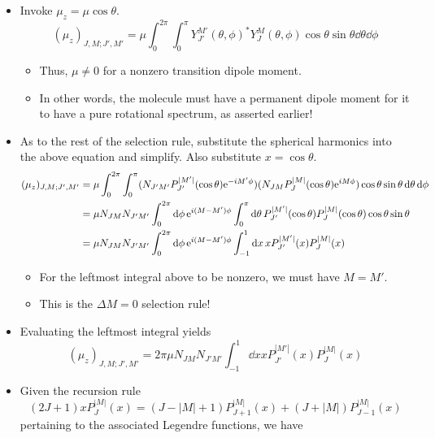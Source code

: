 \documentclass[../notes.tex]{subfiles}
\begin{document}
\begin{itemize}
\begin{equation*}
    \end{equation*}
    \item Invoke $\mu_z=\mu\cos\theta$.
    \begin{equation*}
        (\mu_z)_{J,M;J',M'} = \mu\int_0^{2\pi}\int_0^\pi Y_{J'}^{M'}(\theta,\phi)^*Y_J^M(\theta,\phi)\cos\theta\sin\theta\dd{\theta}\dd{\phi}
    \end{equation*}
    \begin{itemize}
        \item Thus, $\mu\neq 0$ for a nonzero transition dipole moment.
        \item In other words, the molecule must have a permanent dipole moment for it to have a pure rotational spectrum, as asserted earlier!
    \end{itemize}
    \item As to the rest of the selection rule, substitute the spherical harmonics into the above equation and simplify. Also substitute $x=\cos\theta$.
    \begin{align*}
        (\mu_z)_{J,M;J',M'} &= \mu\int_0^{2\pi}\int_0^\pi(N_{J'M'}P_{J'}^{|M'|}(\cos\theta)\e[-iM'\phi])(N_{JM}P_J^{|M|}(\cos\theta)\e[iM\phi])\cos\theta\sin\theta\dd{\theta}\dd{\phi}\\
        &= \mu N_{JM}N_{J'M'}\int_0^{2\pi}\dd{\phi}\e[i(M-M')\phi]\int_0^\pi\dd{\theta}P_{J'}^{|M'|}(\cos\theta)P_J^{|M|}(\cos\theta)\cos\theta\sin\theta\\
        &= \mu N_{JM}N_{J'M'}\int_0^{2\pi}\dd{\phi}\e[i(M-M')\phi]\int_{-1}^1\dd{x}xP_{J'}^{|M'|}(x)P_J^{|M|}(x)
    \end{align*}
    \begin{itemize}
        \item For the leftmost integral above to be nonzero, we must have $M=M'$.
        \item This is the $\Delta M=0$ selection rule!
    \end{itemize}
    \item Evaluating the leftmost integral yields 
    \begin{equation*}
        (\mu_z)_{J,M;J',M'} = 2\pi\mu N_{JM}N_{J'M'}\int_{-1}^1\dd{x}xP_{J'}^{|M'|}(x)P_J^{|M|}(x)
    \end{equation*}
    \item Given the recursion rule
    \begin{equation*}
        (2J+1)xP_J^{|M|}(x) = (J-|M|+1)P_{J+1}^{|M|}(x)+(J+|M|)P_{J-1}^{|M|}(x)
    \end{equation*}
    pertaining to the associated Legendre functions, we have

\end{itemize}
\end{document}
